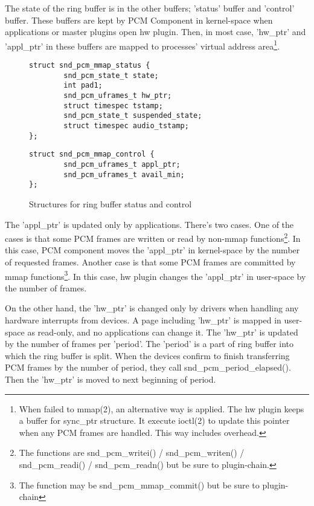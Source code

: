 \documentclass[onecolumn]{article}
\begin{document}
The state of the ring buffer is in the other buffers; 'status' buffer and 'control' buffer. These buffers are kept by PCM Component in kernel-space when applications or master plugins open hw plugin. Then, in most case, 'hw\_ptr' and 'appl\_ptr' in these buffers are mapped to processes' virtual address area\footnote{When failed to mmap(2), an alternative way is applied. The hw plugin keeps a buffer for sync\_ptr structure. It execute ioctl(2) to update this pointer when any PCM frames are handled. This way includes overhead.}.

\begin{figure}
\small
\begin{verbatim}
struct snd_pcm_mmap_status {
        snd_pcm_state_t state;
        int pad1;
        snd_pcm_uframes_t hw_ptr;
        struct timespec tstamp;
        snd_pcm_state_t suspended_state;
        struct timespec audio_tstamp;
};
\end{verbatim}
\begin{verbatim}
struct snd_pcm_mmap_control {
        snd_pcm_uframes_t appl_ptr;
        snd_pcm_uframes_t avail_min;
};
\end{verbatim}
\caption{{Structures for ring buffer status and control}}
\label{pcm-mmap-status-control}
\end{figure}

The 'appl\_ptr' is updated only by applications. There's two cases. One of the cases is that some PCM frames are written or read by non-mmap functions\footnote{The functions are snd\_pcm\_writei() / snd\_pcm\_writen() / snd\_pcm\_readi() / snd\_pcm\_readn() but be sure to plugin-chain.}. In this case, PCM component moves the 'appl\_ptr' in kernel-space by the number of requested frames. Another case is that some PCM frames are committed by mmap functions\footnote{The function may be snd\_pcm\_mmap\_commit() but be sure to plugin-chain}. In this case, hw plugin changes the 'appl\_ptr' in user-space by the number of frames.

On the other hand, the 'hw\_ptr' is changed only by drivers when handling any hardware interrupts from devices. A page including 'hw\_ptr' is mapped in user-space as read-only, and no applications can change it. The 'hw\_ptr' is updated by the number of frames per 'period'. The 'period' is a part of ring buffer into which the ring buffer is split. When the devices confirm to finish transferring PCM frames by the number of period, they call snd\_pcm\_period\_elapsed(). Then the 'hw\_ptr' is moved to next beginning of period.
\end{document}

